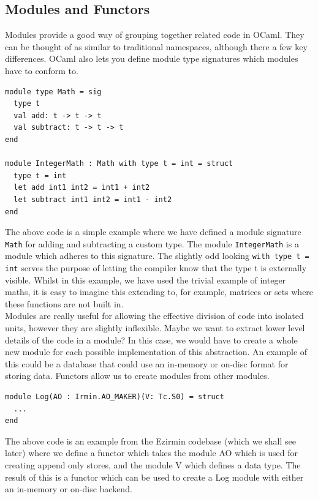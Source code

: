 \documentclass[12pt,a4paper,twoside,openright]{report}
\begin{document}
		\subsection{Modules and Functors}
		Modules provide a good way of grouping together related code in OCaml.
		They can be thought of as similar to traditional namespaces, although there a few key differences.
		OCaml also lets you define module type signatures which modules have to conform to.
		\begin{lstlisting}
module type Math = sig
  type t
  val add: t -> t -> t
  val subtract: t -> t -> t
end

module IntegerMath : Math with type t = int = struct 
  type t = int
  let add int1 int2 = int1 + int2
  let subtract int1 int2 = int1 - int2
end
		\end{lstlisting}
		The above code is a simple example where we have defined a module signature \texttt{Math} for adding and subtracting a custom type.
		The module \texttt{IntegerMath} is a module which adheres to this signature. 
		The slightly odd looking \texttt{with type t = int} serves the purpose of letting the compiler know that the type t is externally visible.
		Whilst in this example, we have used the trivial example of integer maths, it is easy to imagine this extending to, for example, matrices or sets where these functions are not built in.\\

		Modules are really useful for allowing the effective division of code into isolated units, however they are slightly inflexible. 
		Maybe we want to extract lower level details of the code in a module?
		In this case, we would have to create a whole new module for each possible implementation of this abstraction.
		An example of this could be a database that could use an in-memory or on-disc format for storing data.
		Functors allow us to create modules from other modules.
		\begin{lstlisting}
module Log(AO : Irmin.AO_MAKER)(V: Tc.S0) = struct
  ...
end
		\end{lstlisting}
		The above code is an example from the Ezirmin codebase (which we shall see later) where we define a functor which takes the module AO which is used for creating append only stores, and the module V which defines a data type.
		The result of this is a functor which can be used to create a Log module with either an in-memory or on-disc backend.
\end{document}
